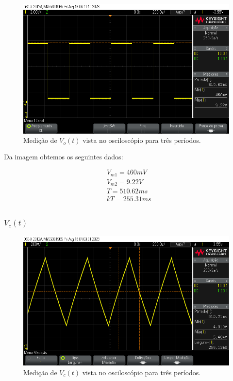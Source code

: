 \begin{figure}[H]
    \label{fig:ex2}
    \centering
    \includegraphics[width=0.7\columnwidth]{images/ex1_vo.png}
    \caption{Medição de $V_o(t)$ vista no osciloscópio para três períodos.}
\end{figure}

Da imagem obtemos os seguintes dados:

\begin{equation}
    \begin{aligned}
         & V_{m1} = 460mV \\
         & V_{m2} = 9.22V \\
         & T = 510.62ms   \\
         & kT =  255.31ms \\
    \end{aligned}
\end{equation}


\subsubsection{$V_c (t)$}

\begin{figure}[H]
    \centering
    \includegraphics[width=0.7\columnwidth]{images/ex1_vc0.png}
    \caption{Medição de $V_c(t)$ vista no osciloscópio para três períodos.}
\end{figure}

